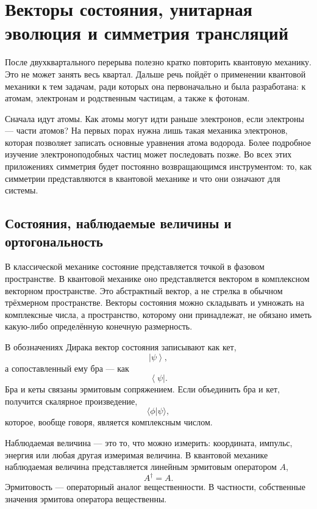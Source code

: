 \chapter{Векторы состояния, унитарная эволюция и симметрия трансляций}
\providecommand{\ket}[1]{\left\lvert#1\right\rangle}
\providecommand{\bra}[1]{\left\langle#1\right\rvert}

После двухквартального перерыва полезно кратко повторить квантовую механику. Это не может занять весь квартал. Дальше речь пойдёт о применении квантовой механики к тем задачам, ради которых она первоначально и была разработана: к атомам, электронам и родственным частицам, а также к фотонам.

Сначала идут атомы. Как атомы могут идти раньше электронов, если электроны — части атомов? На первых порах нужна лишь такая механика электронов, которая позволяет записать основные уравнения атома водорода. Более подробное изучение электроноподобных частиц может последовать позже. Во всех этих приложениях симметрия будет постоянно возвращающимся инструментом: то, как симметрии представляются в квантовой механике и что они означают для системы.

\section{Состояния, наблюдаемые величины и ортогональность}

В классической механике состояние представляется точкой в фазовом пространстве. В квантовой механике оно представляется вектором в комплексном векторном пространстве. Это абстрактный вектор, а не стрелка в обычном трёхмерном пространстве. Векторы состояния можно складывать и умножать на комплексные числа, а пространство, которому они принадлежат, не обязано иметь какую-либо определённую конечную размерность.

В обозначениях Дирака вектор состояния записывают как кет,
\begin{equation}
\ket{\psi},
\end{equation}
а сопоставленный ему бра — как
\begin{equation}
\bra{\psi}.
\end{equation}
Бра и кеты связаны эрмитовым сопряжением. Если объединить бра и кет, получится скалярное произведение,
\begin{equation}
\langle\phi|\psi\rangle,
\end{equation}
которое, вообще говоря, является комплексным числом.

Наблюдаемая величина — это то, что можно измерить: координата, импульс, энергия или любая другая измеримая величина. В квантовой механике наблюдаемая величина представляется линейным эрмитовым оператором \(A\),
\begin{equation}
A^\dagger=A.
\end{equation}
Эрмитовость — операторный аналог вещественности. В частности, собственные значения эрмитова оператора вещественны.

